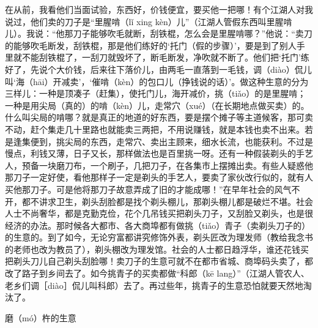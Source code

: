 \documentclass[12pt,UTF8]{ctexbook}
\begin{document}
在从前，我看他们当面试验，东西好，价钱便宜，要买他一把哪！有个江湖人对我说过，他们卖的刀子是“里腥啃（lǐ xing kèn）儿”（江湖人管假东西叫里腥啃儿）。我说：“他那刀子能够吹毛就断，刮铁棍，怎么会是里腥啃哪？”他说：“卖刀的能够吹毛断发，刮铁棍，那是他们练好的‘托门（假的步骤）’，要是到了别人手里就不能刮铁棍了，一刮刀就毁坏了，断毛断发，净吹就不断了。他们把‘托门’练好了，先说个大价钱，后来往下落价儿，由两毛一直落到一毛钱，调（diào）侃儿叫‘海（hāi）开减卖’，‘催啃（kèn）的包口儿（挣钱说的话）’。做这种生意的分为三样儿：一种是顶凑子（赶集），使托门儿，海开减价，挑（tiǎo）的是里腥啃；一种是用尖局（真的）的啃（kèn）儿，走常穴（xué）（在长期地点做买卖）的。什么叫尖局的啃哪？就是真正的地道的好东西，要是摆个摊子等主道候客，那可卖不动，赶个集走几十里路也就能卖三两把，不用说赚钱，就是本钱也卖不出来。若是逢集便到，挑尖局的东西，走常穴、卖出主顾来，细水长流，也能获利。不过是慢点，利钱又薄，日子又长，那样做法也是百里挑一呀。还有一种假装剃头的手艺人，预备一块磨刀布，一个刷子，几把刀子，在各集市上摆摊出卖。有些人疑惑他那刀子一定好使，看他那样子一定是剃头的手艺人，要卖了家伙改行似的，就有人买他那刀子。可是他将那刀子故意弄成了旧的才能成哪！”在早年社会的风气不开，都不讲求卫生，剃头刮脸都是找个剃头棚儿，那剃头棚儿都是破烂不堪。社会人士不尚奢华，都是克勤克俭，花个几吊钱买把剃头刀子，又刮脸又剃头，也是很经济的办法。那时候各大都市、各大商埠都有做挑（tiǎo）青子（卖剃头刀子的）的生意的。到了如今，无论穷富都讲究修饰外表，剃头匠改为理发师（教给我念书的老师也改为教员了），剃头棚改为理发馆。社会的人士都日趋浮华，谁还花钱买把剃头刀儿自己剃头刮脸哪！卖刀子的生意可就不在都市省城、商埠码头卖了，都改了路子到乡间去了。如今挑青子的买卖都做“科郎（kē lang）”（江湖人管农人、老乡们调［diào］侃儿叫科郎）去了。再过些年，挑青子的生意恐怕就要天然地淘汰了。





磨（mó）杵的生意
\end{document}

